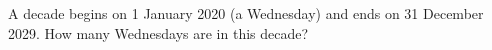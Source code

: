 A decade begins on 1 January 2020 (a Wednesday) and ends on 31 December 2029. How many Wednesdays are in this decade?
